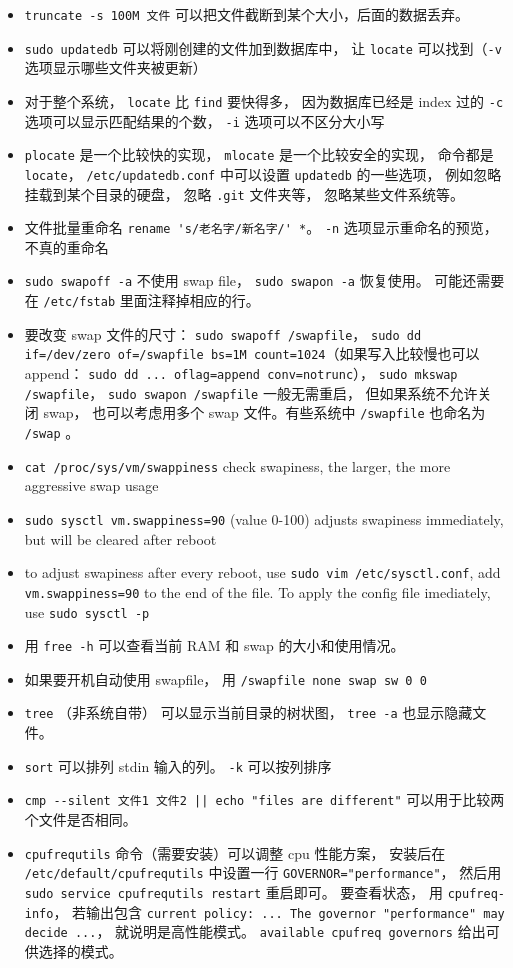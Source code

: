 \begin{itemize}
\item \verb|truncate -s 100M 文件| 可以把文件截断到某个大小，后面的数据丢弃。
\item \verb`sudo updatedb` 可以将刚创建的文件加到数据库中， 让 \verb`locate` 可以找到（\verb|-v| 选项显示哪些文件夹被更新）
\item 对于整个系统， \verb`locate` 比 \verb`find` 要快得多， 因为数据库已经是 index 过的 \verb`-c` 选项可以显示匹配结果的个数， \verb`-i` 选项可以不区分大小写
\item \verb|plocate| 是一个比较快的实现， \verb|mlocate| 是一个比较安全的实现， 命令都是 \verb|locate|， \verb|/etc/updatedb.conf| 中可以设置 \verb|updatedb| 的一些选项， 例如忽略挂载到某个目录的硬盘， 忽略 \verb|.git| 文件夹等， 忽略某些文件系统等。
\item 文件批量重命名 \verb|rename 's/老名字/新名字/' *|。 \verb|-n| 选项显示重命名的预览， 不真的重命名
\item \verb|sudo swapoff -a| 不使用 swap file， \verb|sudo swapon -a| 恢复使用。 可能还需要在 \verb|/etc/fstab| 里面注释掉相应的行。
\item 要改变 swap 文件的尺寸： \verb|sudo swapoff /swapfile|， \verb|sudo dd if=/dev/zero of=/swapfile bs=1M count=1024|（如果写入比较慢也可以 append： \verb|sudo dd ... oflag=append conv=notrunc|）， \verb|sudo mkswap /swapfile|， \verb|sudo swapon /swapfile| 一般无需重启， 但如果系统不允许关闭 swap， 也可以考虑用多个 swap 文件。有些系统中 \verb|/swapfile| 也命名为 \verb|/swap| 。
\item \verb`cat /proc/sys/vm/swappiness` check swapiness, the larger, the more aggressive swap usage
\item \verb`sudo sysctl vm.swappiness=90` (value 0-100) adjusts swapiness immediately, but will be cleared after reboot
\item to adjust swapiness after every reboot, use \verb`sudo vim /etc/sysctl.conf`, add \verb`vm.swappiness=90` to the end of the file. To apply the config file imediately, use \verb`sudo sysctl -p`
\item 用 \verb|free -h| 可以查看当前 RAM 和 swap 的大小和使用情况。
\item 如果要开机自动使用 swapfile， 用 \verb|/swapfile none swap sw 0 0|
\item \verb|tree| （非系统自带） 可以显示当前目录的树状图， \verb|tree -a| 也显示隐藏文件。
\item \verb|sort| 可以排列 stdin 输入的列。 \verb|-k| 可以按列排序
\item \verb`cmp --silent 文件1 文件2 || echo "files are different"` 可以用于比较两个文件是否相同。
\item \verb|cpufrequtils| 命令（需要安装）可以调整 cpu 性能方案， 安装后在 \verb|/etc/default/cpufrequtils| 中设置一行 \verb|GOVERNOR="performance"|， 然后用 \verb|sudo service cpufrequtils restart| 重启即可。 要查看状态， 用 \verb|cpufreq-info|， 若输出包含 \verb|current policy: ... The governor "performance" may decide ...|， 就说明是高性能模式。 \verb|available cpufreq governors| 给出可供选择的模式。
\end{itemize}

